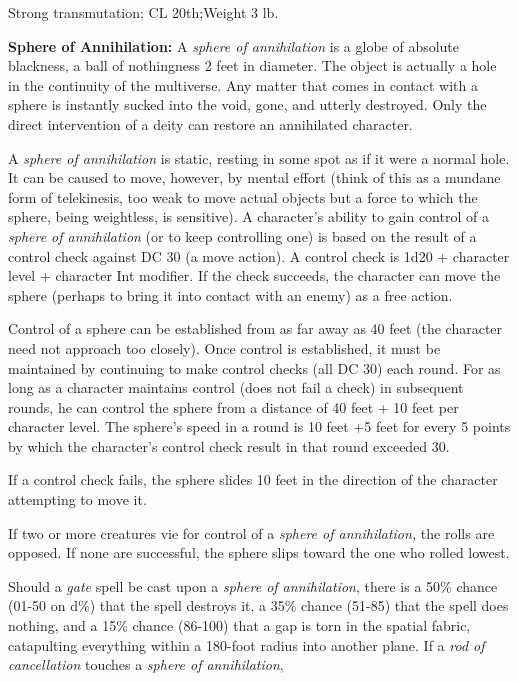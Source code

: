Strong transmutation; CL 20th;Weight 3 lb.

\vspace{12pt}
\textbf{Sphere of Annihilation:} A \textit{sphere of annihilation }is a globe of 
absolute blackness, a ball of nothingness 2 feet in diameter. The object is actually 
a hole in the continuity of the multiverse. Any matter that comes in contact with 
a sphere is instantly sucked into the void, gone, and utterly destroyed. Only the 
direct intervention of a deity can restore an annihilated character.

A \textit{sphere of annihilation }is static, resting in some spot as if it were 
a normal hole. It can be caused to move, however, by mental effort (think of this 
as a mundane form of telekinesis, too weak to move actual objects but a force to 
which the sphere, being weightless, is sensitive). A character's ability to gain 
control of a \textit{sphere of annihilation }(or to keep controlling one) is based 
on the result of a control check against DC 30 (a move action). A control check 
is 1d20 + character level + character Int modifier. If the check succeeds, the 
character can move the sphere (perhaps to bring it into contact with an enemy) 
as a free action.

Control of a sphere can be established from as far away as 40 feet (the character 
need not approach too closely). Once control is established, it must be maintained 
by continuing to make control checks (all DC 30) each round. For as long as a character 
maintains control (does not fail a check) in subsequent rounds, he can control 
the sphere from a distance of 40 feet + 10 feet per character level. The sphere's 
speed in a round is 10 feet +5 feet for every 5 points by which the character's 
control check result in that round exceeded 30.

If a control check fails, the sphere slides 10 feet in the direction of the character 
attempting to move it.

If two or more creatures vie for control of a \textit{sphere of annihilation, }the 
rolls are opposed. If none are successful, the sphere slips toward the one who 
rolled lowest.

Should a \textit{gate }spell be cast upon a \textit{sphere of annihilation}, there 
is a 50\% chance (01-50 on d\%) that the spell destroys it, a 35\% chance (51-85) 
that the spell does nothing, and a 15\% chance (86-100) that a gap is torn in the 
spatial fabric, catapulting everything within a 180-foot radius into another plane. 
If a \textit{rod of cancellation }touches a \textit{sphere of annihilation},

